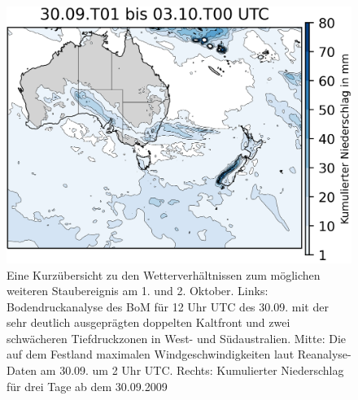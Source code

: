 \documentclass[12pt,a4paper,onecolumn,headheight=30pt]{scrartcl}
\begin{document}
\begin{figure}[htbp]
\begin{minipage}[c]{0.35\textwidth}
	\end{minipage}\hfill
	\begin{minipage}[c]{0.33\textwidth}
		\includegraphics[width=\textwidth]{bilder/rain_october_small.png}
	\end{minipage}\hfill
	\caption{Eine Kurzübersicht zu den Wetterverhältnissen zum möglichen weiteren Staubereignis am 1. und 2. Oktober. Links: Bodendruckanalyse des BoM für 12 Uhr UTC des 30.09. mit der sehr deutlich ausgeprägten doppelten Kaltfront und zwei schwächeren Tiefdruckzonen in West- und Südaustralien. Mitte: Die auf dem Festland maximalen Windgeschwindigkeiten laut Reanalyse-Daten am 30.09. um 2 Uhr UTC. Rechts: Kumulierter Niederschlag für drei Tage ab dem 30.09.2009} \label{fig:october_weather}
\end{figure}
\end{document}
